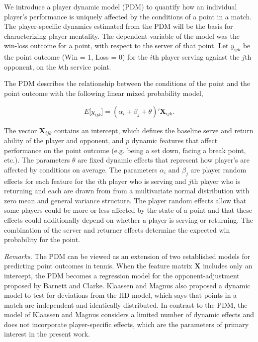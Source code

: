 \documentclass{Latex/svjour3}
\begin{document}
We introduce a player dynamic model (PDM) to quantify how an individual player's
performance is uniquely affected by the conditions of a point in a match. The
player-specific dynamics estimated from the PDM will be the basis for
characterizing player mentality. The dependent variable of the model was the
win-loss outcome for a point, with respect to the server of that point. Let
$y_{ijk}$ be the point outcome (Win = 1, Loss = 0) for the $i$th player serving
against the $j$th opponent, on the $k$th service point.

The PDM describes the relationship between the conditions of the point and the
point outcome with the following linear mixed probability model,

\begin{equation}
E\lbrack y_{ijk} \rbrack = (\alpha_{i} + \beta_{j} + \theta)' \mathbf{X}_{ijk}.
\label{eq:pdm}
\end{equation}

\noindent The vector $\mathbf{X}_{ijk}$ contains an intercept, which defines the
baseline serve and return ability of the player and opponent, and $p$ dynamic
features that affect performance on the point outcome (e.g. being a set down,
facing a break point, etc.). The parameters $\theta$ are fixed dynamic effects
that represent how player's are affected by conditions on average. The
parameters $\alpha_i$ and $\beta_j$ are player random effects for each feature
for the $i$th player who is serving and $j$th player who is returning and each
are drawn from from a multivariate normal distribution with zero mean and
general variance structure. The player random effects allow that some players
could be more or less affected by the state of a point and that these effects
could additionally depend on whether a player is serving or returning. The
combination of the server and returner effects determine the expected win
probability for the point.

\textit{Remarks.} The PDM can be viewed as an extension of two established
models for predicting point outcomes in tennis. When the feature matrix
$\mathbf{X}$ includes only an intercept, the PDM becomes a regression model for
the opponent-adjustment proposed by Barnett and Clarke. Klaassen and Magnus also
proposed a dynamic model to test for deviations from the IID model, which says
that points in a match are independent and identically distributed. In contrast
to the PDM, the model of Klaassen and Magnus considers a limited number of
dynamic effects and does not incorporate player-specific effects, which are the
parameters of primary interest in the present work.
\end{document}
